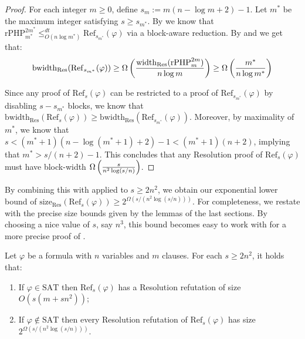 \begin{proof}
    For each integer $m \geq 0$, define $s_m := m(n -\log m + 2)-1$. Let $m^*$ be the maximum integer satisfying $s \geq s_{m^*}$. By  we know that $\mathrm{rPHP}^{2m^*}_{m^*} \leq^{dt}_{O(n\log m^*)} \mathrm{Ref}_{s_{m^*}}(\varphi)$ via a block-aware reduction. By  and  we get that:
    \begin{equation}
        \mathrm{bwidth}_{\mathrm{Res}}(\mathrm{Ref}_{s_{m^*}}(\varphi)) \geq \Omega \left ( \dfrac{\mathrm{width}_{\mathrm{Res}}(\mathrm{rPHP}^{2m}_{m})}{n \log m} \right ) \geq \Omega \left ( \frac{m^*}{n \log m^*} \right )
    \end{equation}

    Since any proof of $\mathrm{Ref}_s(\varphi)$ can be restricted to a proof of $\mathrm{Ref}_{s_{m^*}}(\varphi)$ by disabling $s-s_{m^*}$ blocks, we know that $\mathrm{bwidth}_{\mathrm{Res}}(\mathrm{Ref}_{s}(\varphi))\geq \mathrm{bwidth}_{\mathrm{Res}}(\mathrm{Ref}_{s_{m^*}}(\varphi))$. Moreover, by maximality of $m^*$, we know that $s < (m^*+1)(n - \log (m^*+1) +2) -1 < (m^* +1)(n + 2)$, implying that $m^* > s/(n+2)-1$. This concludes that any Resolution proof of $\mathrm{Ref}_s(\varphi)$ must have block-width $\Omega \left ( \frac{s}{n^2\log(s/n)} \right )$.
\end{proof}

\noindent

By combining this with  applied to $s \geq 2n^2$, we obtain our exponential lower bound of $\mathrm{size}_{\mathrm{Res}}(\mathrm{Ref}_{s}(\varphi)) \geq 2^{\Omega(s/(n^2\log(s/n)))}$. For completeness, we restate  with the precise size bounds given by the lemmas of the last sections. By choosing a nice value of $s$, say $n^3$, this bound becomes easy to work with for a more precise proof of . 

\addtocounter{theorem}{-16}
\begin{theorem}
    \label{thm:ref_bounds_final}
    Let $\varphi$ be a formula with $n$ variables and $m$ clauses. For each $s \geq 2n^2$, it holds that:
    \begin{enumerate}[label={(\roman*)}]
        \item If $\varphi \in \mathrm{SAT}$ then $\mathrm{Ref}_s(\varphi)$ has a Resolution refutation of size $O(s(m+sn^2))$;
        \item If $\varphi \notin \mathrm{SAT}$ then every Resolution refutation of $\mathrm{Ref}_s(\varphi)$ has size $2^{\Omega(s/(n^2\log(s/n)))}$.
    \end{enumerate}
\end{theorem}
\addtocounter{theorem}{15}

